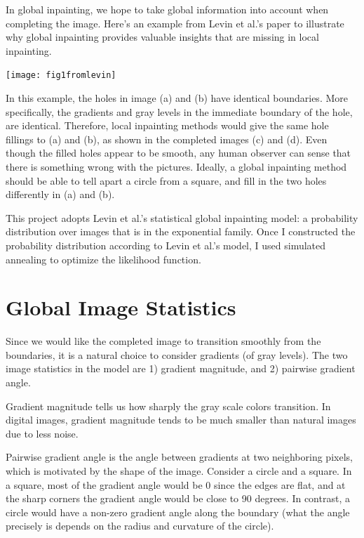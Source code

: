 \documentclass[11pt,letterpaper]{article}
\begin{document}
In global inpainting, we hope to take global information into account when completing the image. Here's an example from Levin et al.'s paper \cite{levin2003learning} to illustrate why global inpainting provides valuable insights that are missing in local inpainting.

\begin{center}
\texttt{[image: fig1fromlevin]}	
\end{center}

In this example, the holes in image (a) and (b) have identical boundaries. More specifically, the gradients and gray levels in the immediate boundary of the hole, are identical. Therefore, local inpainting methods would give the same hole fillings to (a) and (b), as shown in the completed images (c) and (d). Even though the filled holes appear to be smooth, any human observer can sense that there is something wrong with the pictures. Ideally, a global inpainting method should be able to tell apart a circle from a square, and fill in the two holes differently in (a) and (b).

This project adopts Levin et al.'s statistical global inpainting model: a probability distribution over images that is in the exponential family. Once I constructed the probability distribution according to Levin et al.'s model, I used simulated annealing to optimize the likelihood function.

\section{Global Image Statistics}

Since we would like the completed image to transition smoothly from the boundaries, it is a natural choice to consider gradients (of gray levels). The two image statistics in the model are 1) gradient magnitude, and 2) pairwise gradient angle.

Gradient magnitude tells us how sharply the gray scale colors transition. In digital images, gradient magnitude tends to be much smaller than natural images due to less noise. 

Pairwise gradient angle is the angle between gradients at two neighboring pixels, which is motivated by the shape of the image. Consider a circle and a square. In a square, most of the gradient angle would be 0 since the edges are flat, and at the sharp corners the gradient angle would be close to 90 degrees. In contrast, a circle would have a non-zero gradient angle along the boundary (what the angle precisely is depends on the radius and curvature of the circle).
\end{document}

